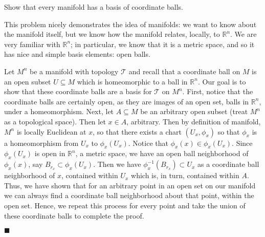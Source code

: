 \documentclass[12pt]{article}
\renewcommand{\qed}{\hfill$\blacksquare$}
\renewenvironment{proof}{\begin{addmargin}[1em]{0em}\begin{newproof}}{\end{newproof}\end{addmargin}\qed}
\newenvironment{problem}[2][Problem]{\begin{trivlist}
\item[\hskip \labelsep {\bfseries #1}\hskip \labelsep {\bfseries #2.}]}{\end{trivlist}}
\begin{document}
\begin{problem}{2-23}
Show that every manifold has a basis of coordinate balls.
\end{problem}
{\color{red} This problem nicely demonstrates the idea of manifolds: we want to know about the manifold itself, but we know how the manifold relates, locally, to $\mathbb{R}^n$. We are very familiar with $\mathbb{R}^n$; in particular, we know that it is a metric space, and so it has nice and simple basis elements: open balls.}
\begin{proof}
Let $M^n$ be a manifold with topology $\mathcal{T}$ and recall that a coordinate ball on $M$ is an open subset $U\subseteq M$ which is homeomorphic to a ball in $\mathbb{R}^n$. Our goal is to show that these coordinate balls are a basis for $\mathcal{T}$ on $M^n$. First, notice that the coordinate balls are certainly open, as they are images of an open set, balls in $\mathbb{R}^n$, under a homeomorphism. Next, let $A\subseteq M$ be an arbitrary open subset (treat $M^n$ as a topological space). Then let $x \in A$, arbitrary. Then by definition of manifold, $M^n$ is locally Euclidean at $x$, so that there exists a chart $\left(U_x, \phi_x\right)$ so that $\phi_x$ is a homeomorphism from $U_x$ to $\phi_x\left(U_x\right)$. Notice that $\phi_x\left(x\right) \in \phi_x\left(U_x\right)$. Since $\phi_x\left(U_x\right)$ is open in $\mathbb{R}^n$, a metric space, we have an open ball neighborhood of $\phi_x\left(x\right)$, say $B_{r_x}\subset \phi_x\left(U_x\right)$. Then we have $\phi^{-1}_x\left(B_{r_x}\right) \subset U_x$ as a coordinate ball neighborhood of $x$, contained within $U_x$ which is, in turn, contained within $A$. Thus, we have shown that for an arbitrary point in an open set on our manifold we can always find a coordinate ball neighborhood about that point, within the open set. Hence, we repeat this process for every point and take the union of these coordinate balls to complete the proof.
\end{proof}
\end{document}

